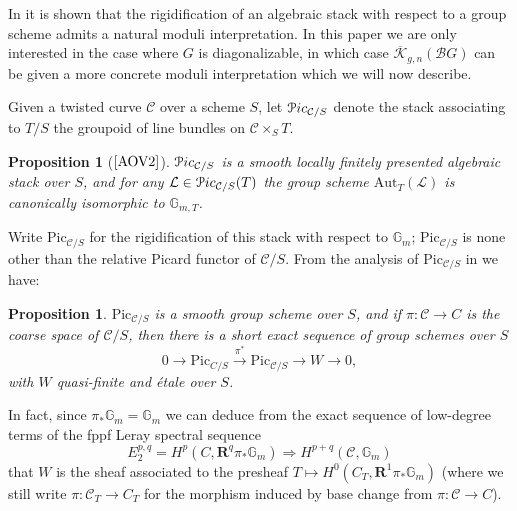 \documentclass[11pt]{amsart}
\newtheorem{proposition}[subsection]{Proposition}
\theoremstyle{definition}
\begin{document}
In \cite[$\textrm{\S}$C.2]{AGV} it is shown that the rigidification of an algebraic stack with respect to a group scheme admits a natural moduli interpretation. In this paper we are only interested in the case where $G$ is diagonalizable, in which case $\overline{\mathcal{K}}_{g,n}({\mathcal{B}} G)$ can be given a more concrete moduli interpretation which we will now describe.

Given a twisted curve ${\mathcal{C}}$ over a scheme $S$, let ${\mathbf{\EuScript{P}}}ic_{{\mathcal{C}}/S}$ denote the stack associating to $T/S$ the groupoid of line bundles on ${\mathcal{C}}\times_S T$.

\begin{proposition}[$\textrm{\cite[2.7]{AOV2}}$]
${\mathbf{\EuScript{P}}}ic_{{\mathcal{C}}/S}$ is a smooth locally finitely presented algebraic stack over $S$, and for any ${\mathcal{L}} \in {\mathbf{\EuScript{P}}}ic_{{\mathcal{C}}/S}(T)$ the group scheme $\mathrm{Aut}_T({\mathcal{L}})$ is canonically isomorphic to $\mathbb{G}_{m,T}$. 
\end{proposition}

Write $\mathrm{Pic}_{{\mathcal{C}}/S}$ for the rigidification of this stack with respect to $\mathbb{G}_m$; $\mathrm{Pic}_{{\mathcal{C}}/S}$ is none other than the relative Picard functor of ${\mathcal{C}}/S$. From the analysis of $\mathrm{Pic}_{{\mathcal{C}}/S}$ in \cite[\S2]{AOV2} we have:

\begin{proposition}\label{picardexact}
$\mathrm{Pic}_{{\mathcal{C}}/S}$ is a smooth group scheme over $S$, and if $\pi:{\mathcal{C}} \rightarrow C$ is the coarse space of ${\mathcal{C}}/S$, then there is a short exact sequence of group schemes over $S$
\begin{displaymath}
0 \rightarrow \mathrm{Pic}_{C/S} \stackrel{\pi^*}{\rightarrow} \mathrm{Pic}_{{\mathcal{C}}/S} \rightarrow W \rightarrow 0,
\end{displaymath}
with $W$ quasi-finite and \'etale over $S$. 
\end{proposition}

In fact, since $\pi_* \mathbb{G}_m = \mathbb{G}_m$ we can deduce from the exact sequence of low-degree terms of the fppf Leray spectral sequence 
\begin{displaymath}
E_2^{p,q} = H^p(C,\mathbf{R}^q\pi_* \mathbb{G}_m) \Rightarrow H^{p+q}({\mathcal{C}}, \mathbb{G}_m) 
\end{displaymath}
that $W$ is the sheaf associated to the presheaf $T \mapsto H^0(C_T,\mathbf{R}^1\pi_* \mathbb{G}_m)$ (where we still write $\pi: {\mathcal{C}}_T \rightarrow C_T$ for the morphism induced by base change from $\pi:{\mathcal{C}} \rightarrow C$).
\end{document}
